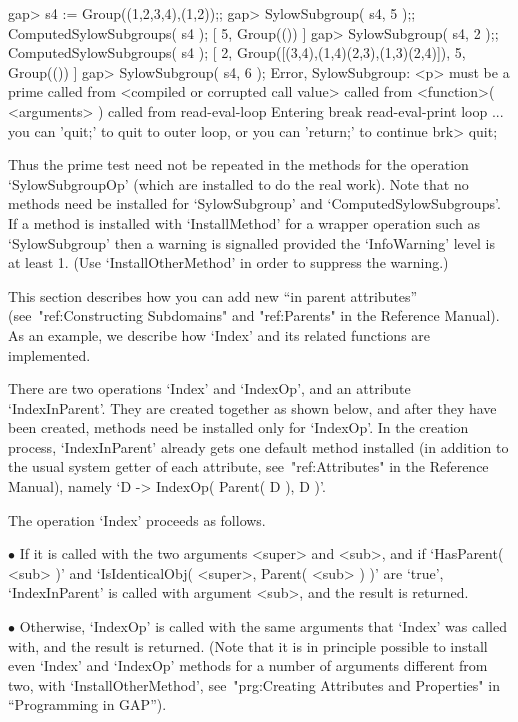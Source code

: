 \beginexample
gap> s4 := Group((1,2,3,4),(1,2));;
gap> SylowSubgroup( s4, 5 );;  ComputedSylowSubgroups( s4 );
[ 5, Group(()) ]
gap> SylowSubgroup( s4, 2 );;  ComputedSylowSubgroups( s4 );
[ 2, Group([(3,4),(1,4)(2,3),(1,3)(2,4)]), 5, Group(()) ]
\endexample
\begintt
gap> SylowSubgroup( s4, 6 );
Error, SylowSubgroup: <p> must be a prime called from
<compiled or corrupted call value>  called from
<function>( <arguments> ) called from read-eval-loop
Entering break read-eval-print loop ...
you can 'quit;' to quit to outer loop, or
you can 'return;' to continue
brk> quit;
\endtt

Thus the prime test need not be repeated in the methods for the operation
`SylowSubgroupOp' (which are installed to do the real work).
Note that no methods need be installed for `SylowSubgroup' and
`ComputedSylowSubgroups'.
If a method is installed with `InstallMethod' for a wrapper operation
such as `SylowSubgroup' then a warning is signalled
provided the `InfoWarning' level is at least 1.
(Use `InstallOtherMethod' in order to suppress the warning.)



This section describes how you can add  new ``in parent attributes''
(see~"ref:Constructing Subdomains" and "ref:Parents" in the Reference Manual).
As an example, we describe how `Index' and its related functions
are implemented.

There are two operations `Index' and `IndexOp',
and an attribute `IndexInParent'.
They are created together as shown below,
and after they have been created,
methods need be installed only for `IndexOp'.
In the creation process, `IndexInParent' already gets one default method
installed
(in addition to the usual system getter of each attribute,
see~"ref:Attributes" in the Reference Manual),
namely `D -> IndexOp( Parent( D ), D )'.

The operation `Index' proceeds as follows.
\beginlist
\item{$\bullet$}
  If it is called with the two arguments <super> and <sub>, and if
  `HasParent( <sub> )' and `IsIdenticalObj( <super>, Parent( <sub> ) )'
  are `true', `IndexInParent' is called with argument <sub>,
  and the result is returned.
\item{$\bullet$}
  Otherwise, `IndexOp' is called with the same arguments that `Index' was
  called with, and the result is returned.
\endlist
(Note that it is in principle possible to install even `Index' and
`IndexOp' methods for a number of arguments different from two,
with `InstallOtherMethod',
see~"prg:Creating Attributes and Properties" in ``Programming in GAP'').

